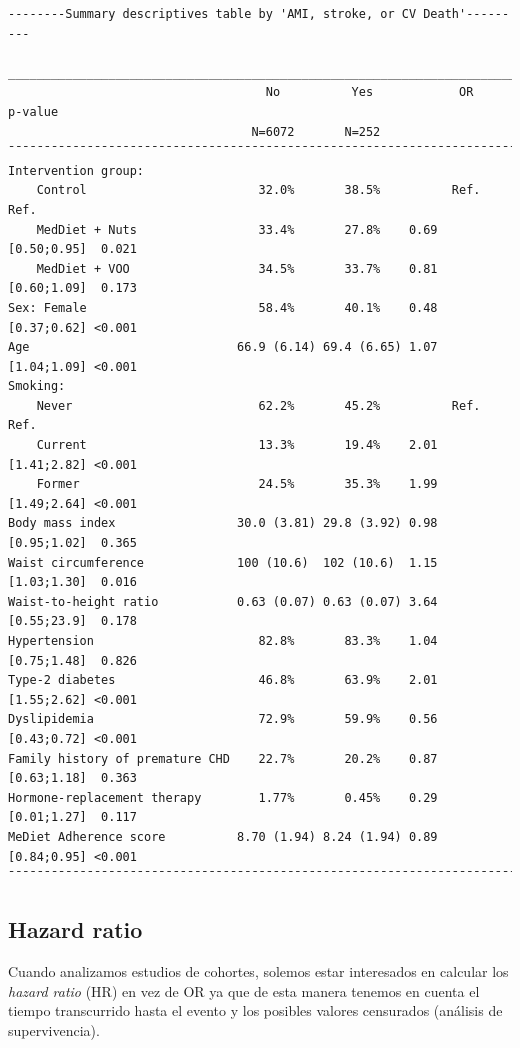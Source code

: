 \documentclass[
]{book}
\begin{document}
\begin{verbatim}
--------Summary descriptives table by 'AMI, stroke, or CV Death'---------

________________________________________________________________________________ 
                                    No          Yes            OR        p-value 
                                  N=6072       N=252                             
¯¯¯¯¯¯¯¯¯¯¯¯¯¯¯¯¯¯¯¯¯¯¯¯¯¯¯¯¯¯¯¯¯¯¯¯¯¯¯¯¯¯¯¯¯¯¯¯¯¯¯¯¯¯¯¯¯¯¯¯¯¯¯¯¯¯¯¯¯¯¯¯¯¯¯¯¯¯¯¯ 
Intervention group:                                                              
    Control                        32.0%       38.5%          Ref.        Ref.   
    MedDiet + Nuts                 33.4%       27.8%    0.69 [0.50;0.95]  0.021  
    MedDiet + VOO                  34.5%       33.7%    0.81 [0.60;1.09]  0.173  
Sex: Female                        58.4%       40.1%    0.48 [0.37;0.62] <0.001  
Age                             66.9 (6.14) 69.4 (6.65) 1.07 [1.04;1.09] <0.001  
Smoking:                                                                         
    Never                          62.2%       45.2%          Ref.        Ref.   
    Current                        13.3%       19.4%    2.01 [1.41;2.82] <0.001  
    Former                         24.5%       35.3%    1.99 [1.49;2.64] <0.001  
Body mass index                 30.0 (3.81) 29.8 (3.92) 0.98 [0.95;1.02]  0.365  
Waist circumference             100 (10.6)  102 (10.6)  1.15 [1.03;1.30]  0.016  
Waist-to-height ratio           0.63 (0.07) 0.63 (0.07) 3.64 [0.55;23.9]  0.178  
Hypertension                       82.8%       83.3%    1.04 [0.75;1.48]  0.826  
Type-2 diabetes                    46.8%       63.9%    2.01 [1.55;2.62] <0.001  
Dyslipidemia                       72.9%       59.9%    0.56 [0.43;0.72] <0.001  
Family history of premature CHD    22.7%       20.2%    0.87 [0.63;1.18]  0.363  
Hormone-replacement therapy        1.77%       0.45%    0.29 [0.01;1.27]  0.117  
MeDiet Adherence score          8.70 (1.94) 8.24 (1.94) 0.89 [0.84;0.95] <0.001  
¯¯¯¯¯¯¯¯¯¯¯¯¯¯¯¯¯¯¯¯¯¯¯¯¯¯¯¯¯¯¯¯¯¯¯¯¯¯¯¯¯¯¯¯¯¯¯¯¯¯¯¯¯¯¯¯¯¯¯¯¯¯¯¯¯¯¯¯¯¯¯¯¯¯¯¯¯¯¯¯ 
\end{verbatim}

\hypertarget{hazard-ratio}{%
\subsection*{Hazard ratio}\label{hazard-ratio}}

Cuando analizamos estudios de cohortes, solemos estar interesados en calcular los \emph{hazard ratio} (HR) en vez de OR ya que de esta manera tenemos en cuenta el tiempo transcurrido hasta el evento y los posibles valores censurados (análisis de supervivencia).
\end{document}

